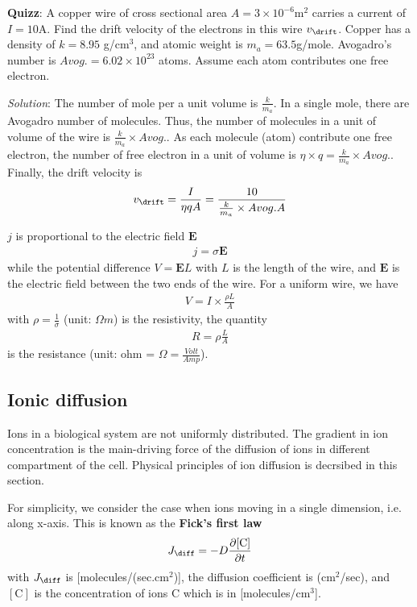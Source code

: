{\bf Quizz}: A copper wire of cross sectional area $A = 3\times
10^{-6}$m$^2$ carries a current of $I=10$A. Find the drift velocity of
the electrons in this wire $v_\drift$. Copper has a density of
$k=8.95$ g/cm$^3$, and atomic weight is
$m_a=63.5$g/mole. Avogadro's number is $Avog.=6.02\times 10^{23}$
atoms. Assume each atom contributes one free electron.

{\it Solution}:  The number of mole per a unit volume is
$\frac{k}{m_a}$. In a single mole, there are Avogadro number of
molecules. Thus, the number of molecules in a unit of volume of the
wire is $\frac{k}{m_a}\times Avog.$. As each molecule (atom)
contribute one free electron, the number of free electron in a unit of
volume is $\eta\times q = \frac{k}{m_a}\times Avog.$. Finally, the
drift velocity is
\begin{eqnarray*}
  v_\drift = \frac{I}{\eta q A} = \frac{10}{\frac{k}{m_a}\times
    Avog. A}
\end{eqnarray*}


\begin{framed}
  $j$ is proportional to the electric field $\mathbf{E}$
  \begin{eqnarray*}
    j= \sigma \mathbf{E}
  \end{eqnarray*}
  while the potential difference $V=\mathbf{E} L$ with $L$ is the length
  of the wire, and $\mathbf{E}$ is the electric field between the two
  ends of the wire. For a uniform wire, we have
  \begin{eqnarray*}
    V = I \times \frac{\rho L }{A}
  \end{eqnarray*}
  with $\rho = \frac{1}{\sigma}$ (unit: $\Omega m$) is the resistivity,
  the quantity
  \begin{eqnarray*}
    R = \rho \frac{L}{A}
  \end{eqnarray*}
  is the resistance (unit: ohm = $\Omega = \frac{Volt}{Amp}$).
\end{framed}

\subsection{Ionic diffusion}
\label{sec:ionic-diffusion}

Ions in a biological system are not uniformly distributed. The
gradient in ion concentration is the main-driving force of the
diffusion of ions in different compartment of the cell. Physical
principles of ion diffusion is decrsibed in this section.

For simplicity, we consider the case when ions moving in a single
dimension, i.e. along x-axis. This is known as the {\bf Fick's first law}
\begin{equation}
  \label{eq:1370}
  J_\diff = -D \frac{\partial[\text{C}]}{\partial t}
\end{equation}
with $J_\diff$ is [molecules/(sec.cm$^2$)], the diffusion coefficient
is (cm$^2$/sec), and $[\text{C}]$ is the concentration of ions C which
is in [molecules/cm$^3$].


